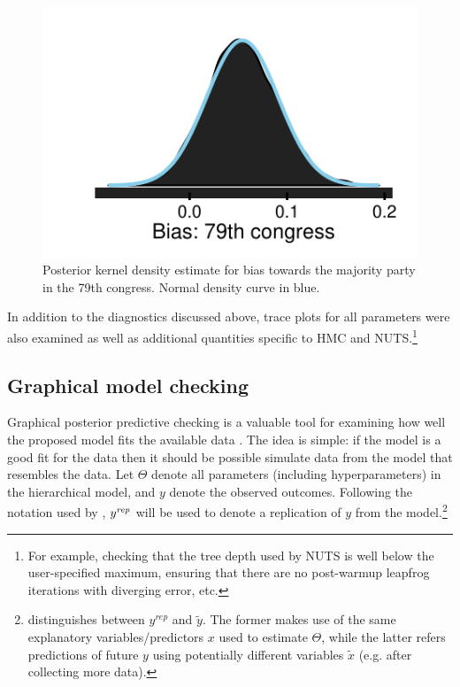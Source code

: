 \begin{figure}[h]
\centering
	\includegraphics[scale=0.75]{sections/figs/example_posterior}
\caption{Posterior kernel density estimate for bias towards the majority party in the 79th congress. Normal density curve in blue.}
\label{fig:ck_example_posterior}
\end{figure}


%
%
%

In addition to the diagnostics discussed above, trace plots for all parameters were also examined as well as additional quantities specific to HMC and NUTS.\footnote{For example, checking that the tree depth used by NUTS is well below the user-specified maximum, ensuring that there are no post-warmup leapfrog iterations with diverging error, etc.}




\subsection{Graphical model checking}
\label{subsection_model_checking}

Graphical posterior predictive checking is a valuable tool for examining how well the proposed model fits the available data . The idea is simple: if the model is a good fit for the data then it should be possible simulate data from the model that resembles the data. Let $\Theta$ denote all parameters (including hyperparameters) in the hierarchical model, and $y$ denote the observed outcomes. Following the notation used by , $y^{\it rep}$ will be used to denote a replication of $y$ from the model.\footnote{ distinguishes between $y^{rep}$ and $\tilde{y}$. The former makes use of the same explanatory variables/predictors $x$ used to estimate $\Theta$, while the latter refers predictions of future $y$ using potentially different variables $\tilde{x}$ (e.g. after collecting more data).}

